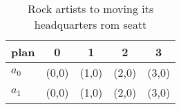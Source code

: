 \documentclass[a4paper]{article}
\begin{document}
\begin{table}
\begin{adjustbox}{width=0.7\columnwidth}
\begin{tabular}{|l|l|l|l|l|}
\hline
\textbf{plan} & \multicolumn{1}{c|}{\textbf{0}} & \multicolumn{1}{c|}{\textbf{1}} & \multicolumn{1}{c|}{\textbf{2}} & \multicolumn{1}{c|}{\textbf{3}} \\ \hline
\textbf{$a_0$}  & (0,0) & (1,0) & (2,0) & (3,0) \\ \hline
\textbf{$a_1$}  & (0,0) & (1,0) & (2,0) & (3,0) \\ \hline
\end{tabular}
\end{adjustbox}
\caption{Rock artists to moving its headquarters rom seatt
}
\end{table}
\end{document}
